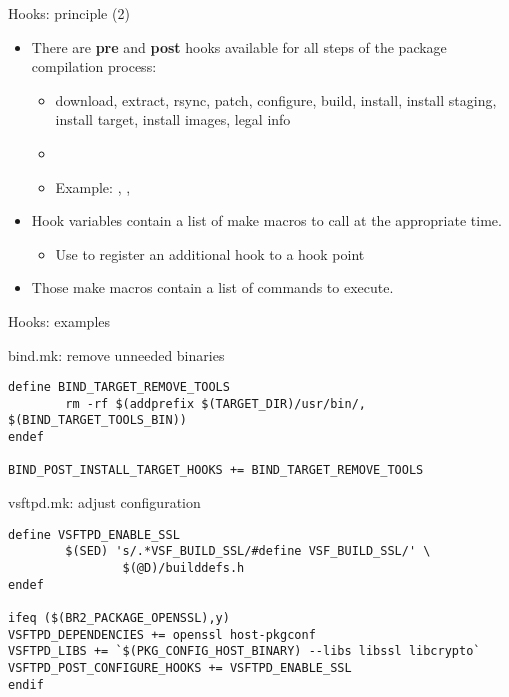 \begin{frame}{Hooks: principle (2)}
  \begin{itemize}
  \item There are {\bf pre} and {\bf post} hooks available for all
    steps of the package compilation process:
    \begin{itemize}
    \item download, extract, rsync, patch, configure, build, install,
      install staging, install target, install images, legal info
    \item {}
    \item Example: ,
      , 
    \end{itemize}
  \item Hook variables contain a list of make macros to call at the
    appropriate time.
    \begin{itemize}
    \item Use \code{+=} to register an additional hook to a hook point
    \end{itemize}
  \item Those make macros contain a list of commands to execute.
  \end{itemize}
\end{frame}

\begin{frame}[fragile]{Hooks: examples}

\begin{block}{bind.mk: remove unneeded binaries}
  \begin{verbatim}
define BIND_TARGET_REMOVE_TOOLS
        rm -rf $(addprefix $(TARGET_DIR)/usr/bin/, $(BIND_TARGET_TOOLS_BIN))
endef

BIND_POST_INSTALL_TARGET_HOOKS += BIND_TARGET_REMOVE_TOOLS
  \end{verbatim}
\end{block}

\begin{block}{vsftpd.mk: adjust configuration}
  \begin{verbatim}
define VSFTPD_ENABLE_SSL
        $(SED) 's/.*VSF_BUILD_SSL/#define VSF_BUILD_SSL/' \
                $(@D)/builddefs.h
endef

ifeq ($(BR2_PACKAGE_OPENSSL),y)
VSFTPD_DEPENDENCIES += openssl host-pkgconf
VSFTPD_LIBS += `$(PKG_CONFIG_HOST_BINARY) --libs libssl libcrypto`
VSFTPD_POST_CONFIGURE_HOOKS += VSFTPD_ENABLE_SSL
endif
  \end{verbatim}
\end{block}

\end{frame}


